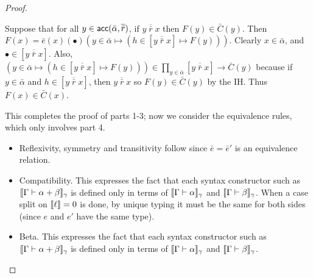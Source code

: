 \begin{proof}
\begin{itemize}
Suppose that for all $y\in\mathsf{acc}(\bar\alpha,\overline{\bar r})$, if $y\;\overline{\bar r}\;x$ then $F(y)\in\bar C(y)$. Then $F(x)=\bar e(x)(\bullet)(y\in \bar\alpha\mapsto(h\in[y\;\overline{\bar r}\;x]\mapsto F(y)))$. Clearly $x\in\bar\alpha$, and $\bullet\in[y\;\overline{\bar r}\;x]$. Also, $(y\in \bar\alpha\mapsto(h\in[y\;\overline{\bar r}\;x]\mapsto F(y)))\in\prod_{y\in\bar\alpha}[y\;\overline{\bar r}\;x]\to\bar C(y)$ because if $y\in\bar\alpha$ and $h\in[y\;\overline{\bar r}\;x]$, then $y\;\overline{\bar r}\;x$ so $F(y)\in\bar C(y)$ by the IH. Thus $F(x)\in\bar C(x)$.
\end{itemize}
This completes the proof of parts 1-3; now we consider the equivalence rules, which only involves part 4.
\begin{itemize}
\item Reflexivity, symmetry and transitivity follow since $\bar e=\bar e'$ is an equivalence relation.
\item Compatibility. This expresses the fact that each syntax constructor such as $\scott{\Gamma\vdash \alpha+\beta}_\gamma$ is defined only in terms of $\scott{\Gamma\vdash \alpha}_\gamma$ and $\scott{\Gamma\vdash\beta}_\gamma$. When a case split on $\llbracket \ell\rrbracket=0$ is done, by unique typing it must be the same for both sides (since $e$ and $e'$ have the same type).
\item Beta. This expresses the fact that each syntax constructor such as $\scott{\Gamma\vdash \alpha+\beta}_\gamma$ is defined only in terms of $\scott{\Gamma\vdash \alpha}_\gamma$ and $\scott{\Gamma\vdash\beta}_\gamma$.
\end{itemize}
\end{proof}
